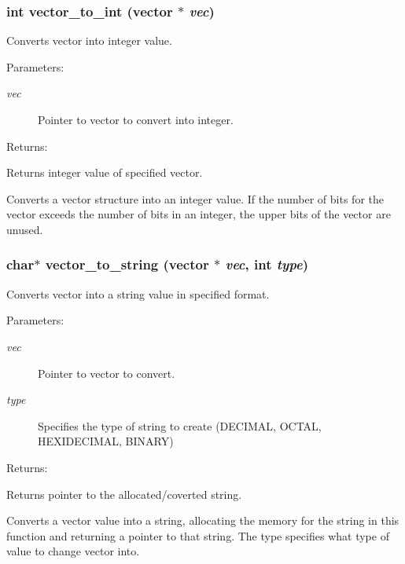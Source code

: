 \subsubsection{\setlength{\rightskip}{0pt plus 5cm}int vector\_\-to\_\-int ({\bf vector} $\ast$ {\em vec})}\label{vector_8c_a25}


Converts vector into integer value.

\begin{Desc}
\item[Parameters: ]\par
\begin{description}
\item[{\em 
vec}]Pointer to vector to convert into integer.\end{description}
\end{Desc}
\begin{Desc}
\item[Returns: ]\par
Returns integer value of specified vector.\end{Desc}
Converts a vector structure into an integer value. If the number of bits for the vector exceeds the number of bits in an integer, the upper bits of the vector are unused. 
\subsubsection{\setlength{\rightskip}{0pt plus 5cm}char$\ast$ vector\_\-to\_\-string ({\bf vector} $\ast$ {\em vec}, int {\em type})}\label{vector_8c_a28}


Converts vector into a string value in specified format.

\begin{Desc}
\item[Parameters: ]\par
\begin{description}
\item[{\em 
vec}]Pointer to vector to convert. \item[{\em 
type}]Specifies the type of string to create (DECIMAL, OCTAL, HEXIDECIMAL, BINARY)\end{description}
\end{Desc}
\begin{Desc}
\item[Returns: ]\par
Returns pointer to the allocated/coverted string.\end{Desc}
Converts a vector value into a string, allocating the memory for the string in this function and returning a pointer to that string. The type specifies what type of value to change vector into. 
